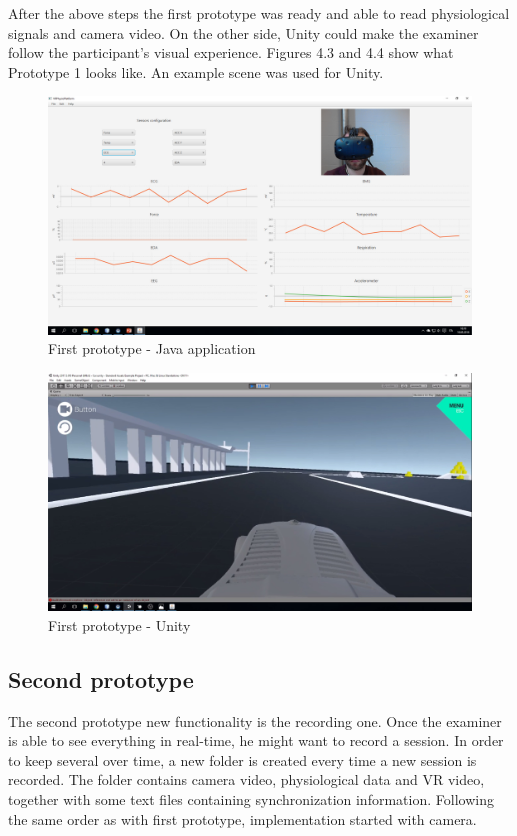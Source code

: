 \documentclass[binding=0.6cm,LaM]{sapthesis}
\begin{document}

After the above steps the first prototype was ready and able to read physiological signals and camera video. On the other side, Unity could make the examiner follow the participant's visual experience. Figures 4.3 and 4.4 show what Prototype 1 looks like. An example scene was used for Unity.

\begin{figure}[p]
\centering
\includegraphics[scale=.45, angle=90]{images/realtime_complete1}
\caption{First prototype - Java application}
\end{figure}

\begin{figure}[p]
\centering
\includegraphics[scale=.45, angle=90]{images/realtime_complete2}
\caption{First prototype - Unity}
\end{figure}
\label{fig:prot1unity}


\subsection{Second prototype}
\label{subsec:secondprot}
The second prototype new functionality is the recording one. Once the examiner is able to see everything in real-time, he might want to record a session. In order to keep several over time, a new folder is created every time a new session is recorded. The folder contains camera video, physiological data and VR video, together with some text files containing synchronization information.
Following the same order as with first prototype, implementation started with camera.
\end{document}
